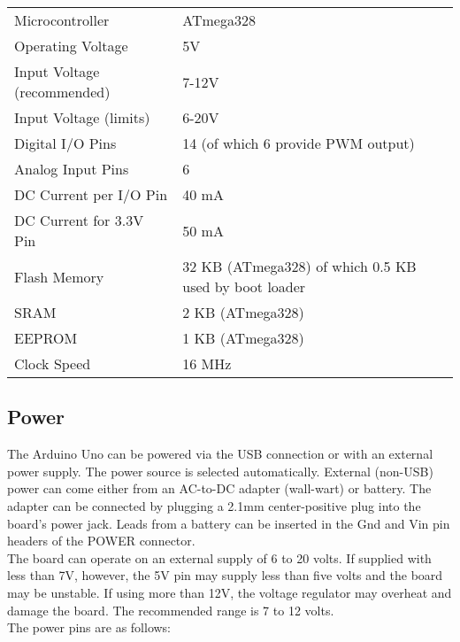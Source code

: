 \documentclass[a4paper, 12pt, notitlepage]{report}
\begin{document}
\begin{tabular}{ll}
		
Microcontroller	& ATmega328\\
Operating Voltage &	5V\\
Input Voltage (recommended) &	7-12V\\
Input Voltage (limits) &	6-20V\\
Digital I/O Pins &	14 (of which 6 provide PWM output)\\
Analog Input Pins	 & 6\\
DC Current per I/O Pin	& 40 mA\\
DC Current for 3.3V Pin	 & 50 mA\\
Flash Memory	& 32 KB (ATmega328) of which 0.5 KB used by boot loader\\
SRAM &	2 KB (ATmega328)\\
EEPROM & 1 KB (ATmega328)\\
Clock Speed &	16 MHz\\

\end{tabular}

\subsection{Power}

The Arduino Uno can be powered via the USB connection or with an external power supply. The power source is selected automatically.
External (non-USB) power can come either from an AC-to-DC adapter (wall-wart) or battery. The adapter can be connected by plugging a 2.1mm center-positive plug into the board's power jack. Leads from a battery can be inserted in the Gnd and Vin pin headers of the POWER connector.\\

The board can operate on an external supply of 6 to 20 volts. If supplied with less than 7V, however, the 5V pin may supply less than five volts and the board may be unstable. If using more than 12V, the voltage regulator may overheat and damage the board. The recommended range is 7 to 12 volts.\\
The power pins are as follows:
\end{document}
